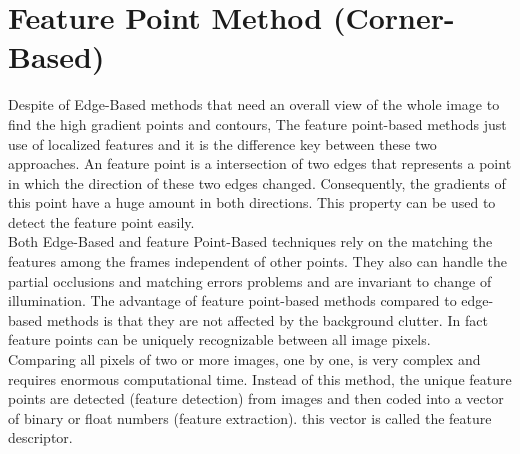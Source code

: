 \section{Feature Point Method (Corner-Based)}
Despite of Edge-Based methods that need an overall view of the whole image to find the high gradient points and contours, The feature point-based methods just use of localized features and it is the difference key between these two approaches. An feature point is a intersection of two edges that represents a point in which the direction of these two edges changed. Consequently, the gradients of this point have a huge amount in both directions. This property can be used to detect the feature point easily.\\
Both Edge-Based and feature Point-Based techniques rely on the matching the features among the frames independent of other points. They also can handle the partial occlusions and matching errors problems and are invariant to change of illumination. The advantage of feature point-based methods compared to edge-based methods is that they are not affected by the background clutter. In fact feature points can be uniquely recognizable between all image pixels.\\
Comparing all pixels of two or more images, one by one, is very complex and requires enormous computational time. Instead of this method, the unique feature points are detected (feature detection) from images and then coded into a vector of binary or float numbers (feature extraction). this vector is called the feature descriptor.\\

